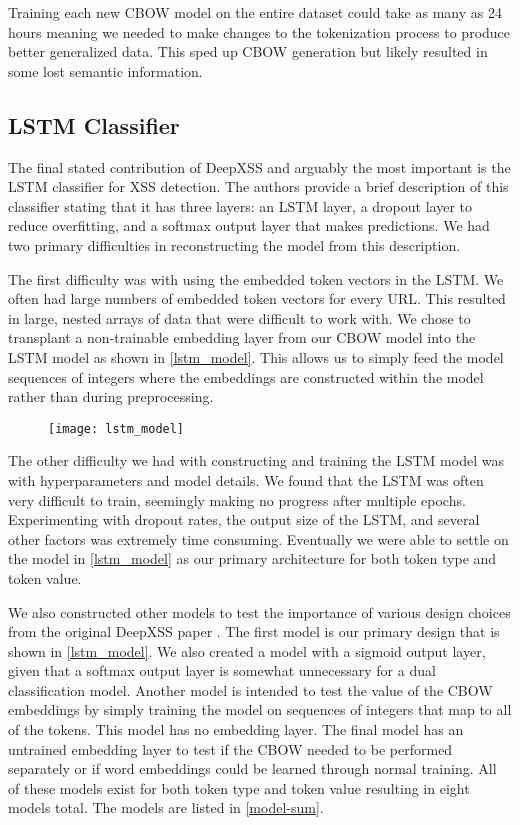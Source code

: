 Training each new CBOW model on the entire dataset could take as many as 24 hours meaning we needed to make changes to the tokenization process to produce better generalized data.  This sped up CBOW generation but likely resulted in some lost semantic information.


\subsection{LSTM Classifier}

The final stated contribution of DeepXSS \cite{fang2018deepxss} and arguably the most important is the LSTM classifier for XSS detection.  The authors provide a brief description of this classifier stating that it has three layers: an LSTM layer, a dropout layer to reduce overfitting, and a softmax output layer that makes predictions.  We had two primary difficulties in reconstructing the model from this description.

The first difficulty was with using the embedded token vectors in the LSTM.  We often had large numbers of embedded token vectors for every URL.  This resulted in large, nested arrays of data that were difficult to work with. We chose to transplant a non-trainable embedding layer from our CBOW model into the LSTM model as shown in \ref{lstm_model}.  This allows us to simply feed the model sequences of integers where the embeddings are constructed within the model rather than during preprocessing.

\begin{figure}[H]
	\texttt{[image: lstm\_model]}
\end{figure}

The other difficulty we had with constructing and training the LSTM model was with hyperparameters and model details. We found that the LSTM was often very difficult to train, seemingly making no progress after multiple epochs.  Experimenting with dropout rates, the output size of the LSTM, and several other factors was extremely time consuming.  Eventually we were able to settle on the model in \ref{lstm_model} as our primary architecture for both token type and token value.

We also constructed other models to test the importance of various design choices from the original DeepXSS paper \cite{fang2018deepxss}.  The first model is our primary design that is shown in \ref{lstm_model}. We also created a model with a sigmoid output layer, given that a softmax output layer is somewhat unnecessary for a dual classification model.  Another model is intended to test the value of the CBOW embeddings by simply training the model on sequences of integers that map to all of the tokens.  This model has no embedding layer.  The final model has an untrained embedding layer to test if the CBOW needed to be performed separately or if word embeddings could be learned through normal training.  All of these models exist for both token type and token value resulting in eight models total.  The models are listed in \ref{model-sum}.




